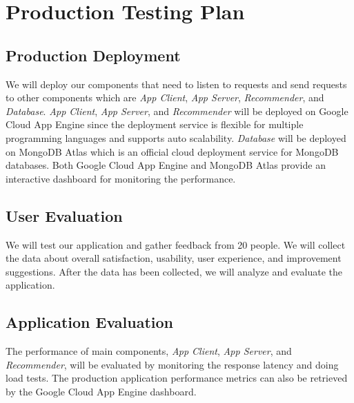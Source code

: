 \documentclass[12pt,oneside,openright,a4paper]{cpe-english-project}
\begin{document}
\section{Production Testing Plan}

\subsection{Production Deployment}

We will deploy our components that need to listen to requests and send requests to other components which are \textit{App Client}, \textit{App Server}, \textit{Recommender}, and \textit{Database}. \textit{App Client}, \textit{App Server}, and \textit{Recommender} will be deployed on Google Cloud App Engine since the deployment service is flexible for multiple programming languages and supports auto scalability. \textit{Database} will be deployed on MongoDB Atlas which is an official cloud deployment service for MongoDB databases. Both Google Cloud App Engine and MongoDB Atlas provide an interactive dashboard for monitoring the performance.

\subsection{User Evaluation}

We will test our application and gather feedback from 20 people. We will collect the data about overall satisfaction, usability, user experience, and improvement suggestions. After the data has been collected, we will analyze and evaluate the application.

\subsection{Application Evaluation}

The performance of main components, \textit{App Client}, \textit{App Server}, and \textit{Recommender}, will be evaluated by monitoring the response latency and doing load tests. The production application performance metrics can also be retrieved by the Google Cloud App Engine dashboard.


\end{document}
